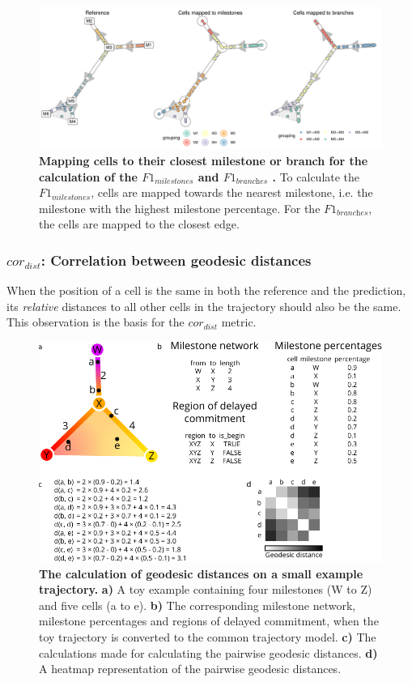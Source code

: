 \begin{figure}[htb!]
	\centering\includegraphics[width=\linewidth]{fig/snote1fig_3.pdf}
	\caption{
		\textbf{Mapping cells to their closest milestone or branch for the calculation of the {$\textit{F1}_{\textit{milestones}}$} and {$\textit{F1}_{\textit{branches}}$} .}
		To calculate the {$\textit{F1}_{\textit{milestones}}$}, cells are mapped towards the nearest milestone, i.e. the milestone with the highest milestone percentage. For the {$\textit{F1}_{\textit{branches}}$}, the cells are mapped to the closest edge.
	}
	\label{fig:snote1fig_3}
\end{figure}

\subsubsection{$\textit{cor}_{\textit{dist}}$: Correlation between geodesic distances}

When the position of a cell is the same in both the reference and the prediction, its \textit{relative} distances to all other cells in the trajectory should also be the same. This observation is the basis for the $\textit{cor}_{\textit{dist}}$ metric.

\begin{figure}[htb!]
	\centering\includegraphics[width=\linewidth]{fig/snote1fig_4.pdf}
	\caption{
		\textbf{The calculation of geodesic distances on a small example trajectory.}
		\textbf{a)} A toy example containing four milestones (W to Z) and five cells (a to e). \textbf{b)} The corresponding milestone network, milestone percentages and regions of delayed commitment, when the toy trajectory is converted to the common trajectory model. \textbf{c)} The calculations made for calculating the pairwise geodesic distances. \textbf{d)} A heatmap representation of the pairwise geodesic distances.
	}
	\label{fig:snote1fig_4}
\end{figure}

